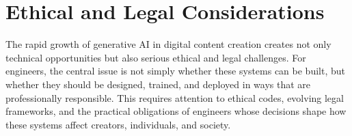 
























\newpage
\section{Ethical and Legal Considerations}

The rapid growth of generative AI in digital content creation creates not only technical opportunities but also serious ethical and legal challenges. For engineers, the central issue is not simply whether these systems can be built, but whether they should be designed, trained, and deployed in ways that are professionally responsible. This requires attention to ethical codes, evolving legal frameworks, and the practical obligations of engineers whose decisions shape how these systems affect creators, individuals, and society.

